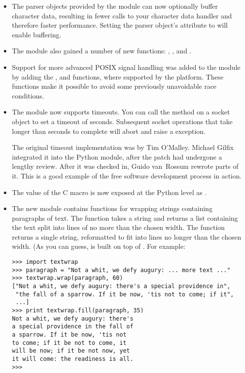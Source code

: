 \documentclass{howto}
\begin{document}
\begin{itemize}
\item The parser objects provided by the  module 
can now optionally buffer character data, resulting in fewer calls to
your character data handler and therefore faster performance.  Setting
the parser object's  attribute to  
will enable buffering.

\item The  module also gained a number of new
functions: ,
, and .

\item Support for more advanced POSIX signal handling was added
to the  module by adding the ,
 and  functions, where supported
by the platform.  These functions make it possible to avoid some previously
unavoidable race conditions.

\item The  module now supports timeouts.  You
can call the  method on a socket object to
set a timeout of  seconds.  Subsequent socket operations that
take longer than  seconds to complete will abort and raise a
 exception.  

The original timeout implementation was by Tim O'Malley.  Michael
Gilfix integrated it into the Python  module, after the
patch had undergone a lengthy review.  After it was checked in, Guido
van~Rossum rewrote parts of it.  This is a good example of the free
software development process in action.

\item The value of the C  macro is now exposed 
at the Python level as .

\item The new  module contains functions for wrapping
strings containing paragraphs of text.  The  function takes a string and returns a list containing
the text split into lines of no more than the chosen width.  The
 function returns a single
string, reformatted to fit into lines no longer than the chosen width.
(As you can guess,  is built on top of
.  For example:

\begin{verbatim}
>>> import textwrap
>>> paragraph = "Not a whit, we defy augury: ... more text ..."
>>> textwrap.wrap(paragraph, 60)
["Not a whit, we defy augury: there's a special providence in", 
 "the fall of a sparrow. If it be now, 'tis not to come; if it", 
 ...]
>>> print textwrap.fill(paragraph, 35)
Not a whit, we defy augury: there's
a special providence in the fall of
a sparrow. If it be now, 'tis not
to come; if it be not to come, it
will be now; if it be not now, yet
it will come: the readiness is all.
>>> 
\end{verbatim}


\end{itemize}
\end{document}

